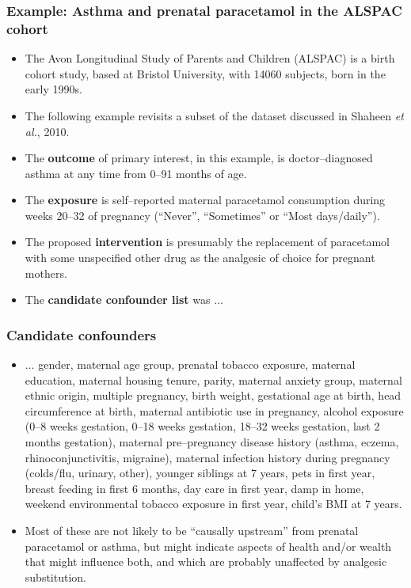 \documentclass[11pt]{beamer}
\begin{document}
\begin{frame}
\frametitle{Example: Asthma and prenatal paracetamol in the ALSPAC cohort}

\begin{itemize}

\item<2-> The Avon Longitudinal Study of Parents and Children (ALSPAC) is a birth cohort study,
based at Bristol University, with 14060 subjects, born in the early 1990s.

\item<3-> The following example revisits a subset of the dataset discussed
in Shaheen \textit{et al.}, 2010\cite{shaheen2010}.

\item<4-> The \textbf{outcome} of primary interest, in this example,
is doctor--diagnosed asthma at any time
from 0--91 months of age.

\item<5-> The \textbf{exposure} is self--reported maternal paracetamol consumption
during weeks 20--32 of pregnancy
(``Never'', ``Sometimes'' or ``Most days/daily'').

\item<6-> The proposed \textbf{intervention} is presumably the replacement of paracetamol
with some unspecified other drug
as the analgesic of choice for pregnant mothers.

\item<7-> The \textbf{candidate confounder list} was $\ldots$

\end{itemize}

\end{frame}

\begin{frame}
\frametitle{Candidate confounders}

\begin{itemize}

\item<2-> $\ldots$ gender, maternal age group, prenatal tobacco exposure,
maternal education, maternal housing tenure,
parity, maternal anxiety group,
maternal ethnic origin, multiple pregnancy,
birth weight, gestational age at birth, head circumference at birth,
maternal antibiotic use in pregnancy,
alcohol exposure (0--8 weeks gestation, 0--18 weeks gestation, 18--32 weeks gestation, last 2 months gestation),
maternal pre--pregnancy disease history (asthma, eczema, rhinoconjunctivitis, migraine),
maternal infection history during pregnancy (colds/flu, urinary, other),
younger siblings at 7 years, pets in first year, breast feeding in first 6 months,
day care in first year, damp in home, 
weekend environmental tobacco exposure in first year,
child's BMI at 7 years.

\item<3-> Most of these are not likely to be ``causally upstream'' from prenatal paracetamol or asthma,
but might indicate aspects of health and/or wealth that might influence both,
and which are probably unaffected by analgesic substitution.

\end{itemize}

\end{frame}
\end{document}
